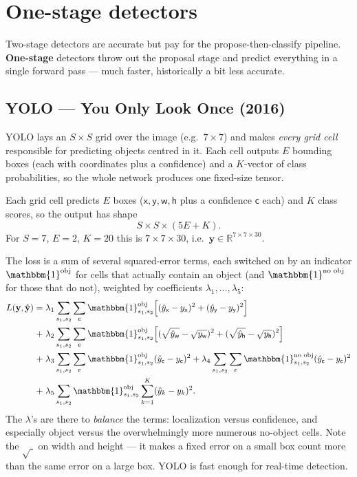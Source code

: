 \documentclass[11pt, oneside]{book}
\newcommand{\R}{\mathbb{R}}
\newcommand{\ind}{\mathbbm{1}}           %
\newcommand{\yvec}{\mathbf{y}}
\begin{document}
\section{One-stage detectors}

Two-stage detectors are accurate but pay for the propose-then-classify pipeline.
\textbf{One-stage} detectors throw out the proposal stage and predict everything
in a single forward pass --- much faster, historically a bit less accurate.

\subsection{YOLO --- You Only Look Once (2016)}

YOLO lays an $S\times S$ grid over the image (e.g.\ $7\times 7$) and makes
\emph{every grid cell} responsible for predicting objects centred in it. Each cell
outputs $E$ bounding boxes (each with coordinates plus a confidence) and a
$K$-vector of class probabilities, so the whole network produces one fixed-size
tensor.

\begin{thmbox}[title={YOLO output tensor}]
Each grid cell predicts $E$ boxes ($\mathsf{x},\mathsf{y},\mathsf{w},\mathsf{h}$
plus a confidence $\mathsf{c}$ each) and $K$ class scores, so the output has shape
\[
  S \times S \times (5E + K).
\]
For $S=7$, $E=2$, $K=20$ this is $7\times 7\times 30$, i.e.\
$\yvec \in \R^{7\times 7\times 30}$.
\end{thmbox}

The loss is a sum of several squared-error terms, each switched on by an
indicator $\ind^{\text{obj}}$ for cells that actually contain an object (and
$\ind^{\text{no obj}}$ for those that do not), weighted by coefficients
$\lambda_1,\dots,\lambda_5$:
\[
\begin{aligned}
L(\yvec,\hat{\yvec}) =\;
& \lambda_1 \sum_{s_1,s_2}\sum_{e} \ind^{\text{obj}}_{s_1,s_2}
  \Big[(\hat{y}_{\mathsf{x}}-y_{\mathsf{x}})^2+(\hat{y}_{\mathsf{y}}-y_{\mathsf{y}})^2\Big] \\
+\;& \lambda_2 \sum_{s_1,s_2}\sum_{e} \ind^{\text{obj}}_{s_1,s_2}
  \Big[(\sqrt{\hat{y}_{\mathsf{w}}}-\sqrt{y_{\mathsf{w}}})^2
       +(\sqrt{\hat{y}_{\mathsf{h}}}-\sqrt{y_{\mathsf{h}}})^2\Big] \\
+\;& \lambda_3 \sum_{s_1,s_2}\sum_{e} \ind^{\text{obj}}_{s_1,s_2}
  (\hat{y}_{\mathsf{c}}-y_{\mathsf{c}})^2
 + \lambda_4 \sum_{s_1,s_2}\sum_{e} \ind^{\text{no obj}}_{s_1,s_2}
  (\hat{y}_{\mathsf{c}}-y_{\mathsf{c}})^2 \\
+\;& \lambda_5 \sum_{s_1,s_2} \ind^{\text{obj}}_{s_1,s_2}
  \sum_{k=1}^{K}(\hat{y}_{k}-y_{k})^2 .
\end{aligned}
\]
The $\lambda$'s are there to \emph{balance} the terms: localization versus
confidence, and especially object versus the overwhelmingly more numerous
no-object cells. Note the $\sqrt{\;}$ on width and height --- it makes a fixed
error on a small box count more than the same error on a large box. YOLO is fast
enough for real-time detection.
\end{document}
